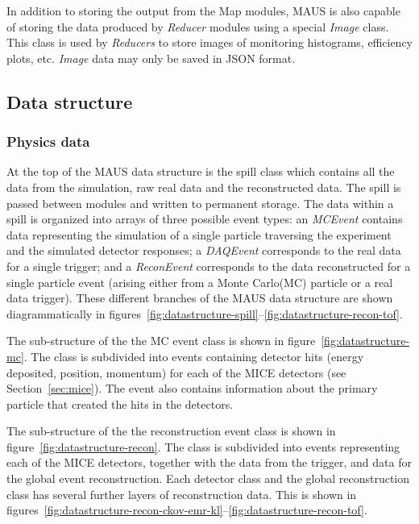 \documentclass[11pt]{article}
\begin{document}
In addition to storing the output from the Map modules, MAUS is also capable of storing the data  produced by  \emph{Reducer} modules using a special \emph{Image} class. This class is used by \emph{Reducers} to store images of monitoring histograms, efficiency plots, etc. \emph{Image} data may only be saved in JSON format.

%
\subsection{Data structure}\label{sec:maus-datastr}

\subsubsection{Physics data} \label{sec:physics-datastr}

At the top of the MAUS data structure is the spill class which contains all the data from the simulation, raw real data and the reconstructed data. The spill is passed between modules and written to permanent storage. The data within a spill is organized into arrays of three possible event types: an \emph{MCEvent} contains data  representing the simulation of a single particle traversing the experiment and the simulated detector responses; a \emph{DAQEvent} corresponds to the real data for a single trigger; and a \emph{ReconEvent} corresponds to the data reconstructed for a single particle event (arising either from a Monte Carlo(MC) particle or a real data trigger). These different branches of the MAUS data structure are shown diagrammatically in figures~\ref{fig:datastructure-spill}--\ref{fig:datastructure-recon-tof}.

The sub-structure of the the MC event class is shown in figure~\ref{fig:datastructure-mc}. The class is subdivided into events containing detector hits (energy deposited, position, momentum) for each of the MICE detectors (see Section~\ref{sec:mice}). The event also contains information about the primary particle that created the hits in the detectors.

The sub-structure of the the reconstruction event class is shown in figure~\ref{fig:datastructure-recon}. The class is subdivided into events representing each of the MICE detectors, together with the data from the trigger, and data for the global event reconstruction. Each detector class and the global reconstruction class has several further layers of reconstruction data. This is shown in figures~\ref{fig:datastructure-recon-ckov-emr-kl}--\ref{fig:datastructure-recon-tof}.
\end{document}
